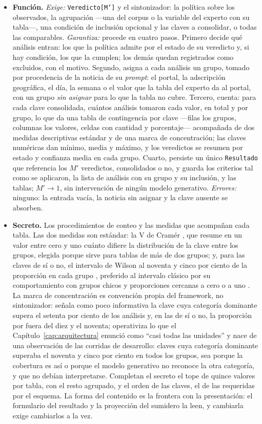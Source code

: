 \documentclass[12pt]{report}
\begin{document}
\begin{itemize}
  \item \textbf{Función.} \textit{Exige:} \texttt{Veredicto[M']} y el sintonizador: la política sobre los observados, la agrupación ---una del corpus o la variable del experto con su tabla---, una condición de inclusión opcional y las claves a consolidar, o todas las comparables. \textit{Garantiza:} procede en cuatro pasos. Primero decide qué análisis entran: los que la política admite por el estado de su veredicto y, si hay condición, los que la cumplen; los demás quedan registrados como excluidos, con el motivo. Segundo, asigna a cada análisis un grupo, tomado por procedencia de la noticia de su \textit{prompt}: el portal, la adscripción geográfica, el día, la semana o el valor que la tabla del experto da al portal, con un grupo \textit{sin asignar} para lo que la tabla no cubre. Tercero, cuenta: para cada clave consolidada, cuántos análisis tomaron cada valor, en total y por grupo, lo que da una tabla de contingencia por clave ---filas los grupos, columnas los valores, celdas con cantidad y porcentaje--- acompañada de dos medidas descriptivas estándar y de una marca de concentración; las claves numéricas dan mínimo, media y máximo, y los veredictos se resumen por estado y confianza media en cada grupo. Cuarto, persiste un único \texttt{Resultado} que referencia los \(M'\) veredictos, consolidados o no, y guarda los criterios tal como se aplicaron, la lista de análisis con su grupo y su inclusión, y las tablas; \(M' \to 1\), sin intervención de ningún modelo generativo. \textit{Errores:} ninguno: la entrada vacía, la noticia sin asignar y la clave ausente se absorben.
  \item \textbf{Secreto.} Los procedimientos de conteo y las medidas que acompañan cada tabla. Las dos medidas son estándar: la V de Cramér \citep{cramer:1946}, que resume en un valor entre cero y uno cuánto difiere la distribución de la clave entre los grupos, elegida porque sirve para tablas de más de dos grupos; y, para las claves de sí o no, el intervalo de Wilson al noventa y cinco por ciento de la proporción en cada grupo \citep{wilson:1927}, preferido al intervalo clásico por su comportamiento con grupos chicos y proporciones cercanas a cero o a uno \citep{agresticoull:1998, brownetal:2001}. La marca de concentración es convención propia del framework, no sintonizador: señala como poco informativa la clave cuya categoría dominante supera el setenta por ciento de los análisis y, en las de sí o no, la proporción por fuera del diez y el noventa; operativiza lo que el Capítulo~\ref{cap:arquitectura} enunció como ``casi todas las unidades'' y nace de una observación de las corridas de desarrollo: claves cuya categoría dominante superaba el noventa y cinco por ciento en todos los grupos, sea porque la cobertura es así o porque el modelo generativo no reconoce la otra categoría, y que no debían interpretarse. Completan el secreto el tope de quince valores por tabla, con el resto agrupado, y el orden de las claves, el de las requeridas por el esquema. La forma del contenido es la frontera con la presentación: el formulario del resultado y la proyección del sumidero la leen, y cambiarla exige cambiarlos a la vez.

\end{itemize}
\end{document}
